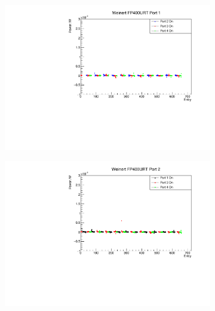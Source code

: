 \documentclass[a4paper,11pt]{article}
\begin{document}
\begin{figure}[h!]
\centering
\begin{subfigure}{0.5\textwidth}
\includegraphics[width=\linewidth]{WeinertFP400URTPort1.pdf}
\subcaption{}\label{fig:weinfp400crosstalkport1}
\end{subfigure}%
\begin{subfigure}{0.5\textwidth}
\includegraphics[width=\linewidth]{WeinertFP400URTPort2.pdf}
\subcaption{}\label{fig:weinfp400crosstalkport2}
\end{subfigure}
\\
\begin{subfigure}{0.5\textwidth}

\end{subfigure}
\end{figure}
\end{document}
